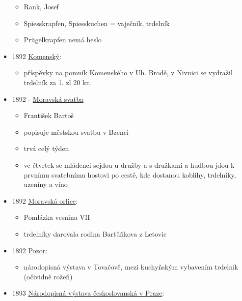 \begin{itemize}
  \begin{itemize}
  \tightlist
  \item
    Rank, Josef
  \item
    Spiesskrapfen, Spiesskuchen = vaječník, trdelník
  \item
    Prügelkrapfen nemá heslo
  \end{itemize}
\item
  1892
  \href{https://www.google.cz/books/edition/Komensk\%C3\%BD/twVGAQAAMAAJ?hl=cs&gbpv=1&dq=trdeln\%C3\%ADk&pg=RA2-PA181&printsec=frontcover}{Komenský}:

  \begin{itemize}
  \tightlist
  \item
    příspěvky na pomník Komenského v Uh. Brodě, v Nivnici se vydražil
    trdelník za 1. zl 20 kr.
  \end{itemize}
\item
  1892 -
  \href{https://ndk.cz/view/uuid:289bb2c0-9f1e-11dc-bf2d-000d606f5dc6?page=uuid\%3Aca676860-e56d-11e7-8cdd-5ef3fc9bb22f&fulltext=trdeln\%C3\%ADky}{Moravská
  svatba}

  \begin{itemize}
  \tightlist
  \item
    František Bartoš
  \item
    popisuje městskou svatbu v Bzenci
  \item
    trvá celý týden
  \item
    ve čtvrtek se mládenci sejdou u družby a s družkami a hudbou jdou k
    prvnímu svatebnímu hostovi po cestě, kde dostanou koblihy,
    trdelníky, uzeniny a víno
  \end{itemize}
\item
  1892
  \href{https://ceskadigitalniknihovna.cz/uuid/uuid:04f469ce-32f0-11de-992b-00145e5790ea}{Moravská
  orlice}:

  \begin{itemize}
  \tightlist
  \item
    Pomlázka vesnina VII
  \item
    trdelníky darovala rodina Bartůňkova z Letovic
  \end{itemize}
\item
  1892
  \href{https://www.digitalniknihovna.cz/vkol/uuid/uuid:db92b18a-5f60-46e9-a666-022fa9c0f4f6}{Pozor}:

  \begin{itemize}
  \tightlist
  \item
    národopisná výstava v Tovačově, mezi kuchyňským vybavením trdelník
    (očividně rožeň)
  \end{itemize}
\item
  1893
  \href{https://ceskadigitalniknihovna.cz/uuid/uuid:765160d0-b6d7-11ea-b68c-005056827e52}{Národopisná
  výstava českoslovanská v Praze}:


\end{itemize}
